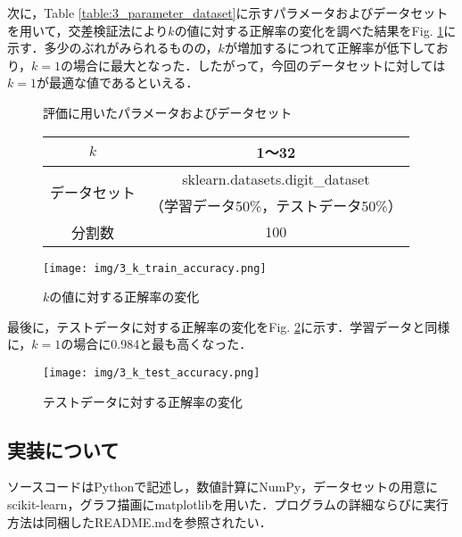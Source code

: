 \documentclass[a4paper,12pt]{jsarticle}
\makeatletter
\newcommand{\figcap}{\def\@captype{figure}}
\newcommand{\tabcap}{\def\@captype{table}}
\renewcommand{\figurename}{Fig. }
\renewcommand{\tablename}{Table }
\makeatother
\begin{document}
次に，\tablename\ref{table:3_parameter_dataset}に示すパラメータおよびデータセットを用いて，交差検証法により$k$の値に対する正解率の変化を調べた結果を\figurename\ref{fig:3_k_accuracy}に示す．多少のぶれがみられるものの，$k$が増加するにつれて正解率が低下しており，$k = 1$の場合に最大となった．したがって，今回のデータセットに対しては$k = 1$が最適な値であるといえる．

\begin{figure}[htbp]
  \centering
  \begin{minipage}[c]{0.5\linewidth}
    \centering
    \tabcap \caption{評価に用いたパラメータおよびデータセット}
    \label{table:3_parameter_dataset}
    \begin{tabular}{cc}
      \toprule
      $k$                     & 1～32                            \\
      \midrule
      \multirow{2}{*}{データセット} & sklearn.datasets.digit\_dataset \\
                              & （学習データ50\%，テストデータ50\%）          \\
      分割数                     & 100                             \\
      \bottomrule
    \end{tabular}
  \end{minipage}
  \hspace{0.05\linewidth}
  \begin{minipage}[c]{0.35\linewidth}
    \centering
    \texttt{[image: img/3\_k\_train\_accuracy.png]}
    \figcap \caption{$k$の値に対する正解率の変化}
    \label{fig:3_k_accuracy}
  \end{minipage}
\end{figure}

最後に，テストデータに対する正解率の変化を\figurename\ref{fig:3_k_test_accuracy}に示す．学習データと同様に，$k = 1$の場合に0.984と最も高くなった．

\begin{figure}[htbp]
  \centering
  \texttt{[image: img/3\_k\_test\_accuracy.png]}
  \caption{テストデータに対する正解率の変化}
  \label{fig:3_k_test_accuracy}
\end{figure}

\subsection*{実装について}

ソースコードはPythonで記述し，数値計算にNumPy，データセットの用意にscikit-learn，グラフ描画にmatplotlibを用いた．プログラムの詳細ならびに実行方法は同梱したREADME.mdを参照されたい．
\end{document}
